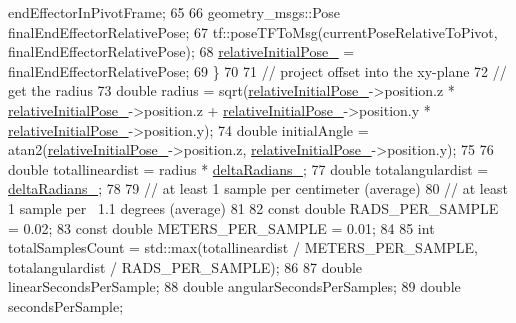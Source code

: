 \begin{DoxyCode}
      endEffectorInPivotFrame;
65 
66                 geometry\_msgs::Pose finalEndEffectorRelativePose;
67                 tf::poseTFToMsg(currentPoseRelativeToPivot, finalEndEffectorRelativePose);
68                 \hyperlink{classcl__move__group__interface_1_1CbCircularPivotMotion_a1b2cc65d2f27a4dec54c20f1f00d4bb8}{relativeInitialPose\_} = finalEndEffectorRelativePose;
69             \}
70 
71             \textcolor{comment}{// project offset into the xy-plane}
72             \textcolor{comment}{// get the radius}
73             \textcolor{keywordtype}{double} radius = sqrt(\hyperlink{classcl__move__group__interface_1_1CbCircularPivotMotion_a1b2cc65d2f27a4dec54c20f1f00d4bb8}{relativeInitialPose\_}->position.z * 
      \hyperlink{classcl__move__group__interface_1_1CbCircularPivotMotion_a1b2cc65d2f27a4dec54c20f1f00d4bb8}{relativeInitialPose\_}->position.z + \hyperlink{classcl__move__group__interface_1_1CbCircularPivotMotion_a1b2cc65d2f27a4dec54c20f1f00d4bb8}{relativeInitialPose\_}->position.y
       * \hyperlink{classcl__move__group__interface_1_1CbCircularPivotMotion_a1b2cc65d2f27a4dec54c20f1f00d4bb8}{relativeInitialPose\_}->position.y);
74             \textcolor{keywordtype}{double} initialAngle = atan2(\hyperlink{classcl__move__group__interface_1_1CbCircularPivotMotion_a1b2cc65d2f27a4dec54c20f1f00d4bb8}{relativeInitialPose\_}->position.z, 
      \hyperlink{classcl__move__group__interface_1_1CbCircularPivotMotion_a1b2cc65d2f27a4dec54c20f1f00d4bb8}{relativeInitialPose\_}->position.y);
75 
76             \textcolor{keywordtype}{double} totallineardist = radius * \hyperlink{classcl__move__group__interface_1_1CbCircularPivotMotion_afade33f1182615c64ea972075bfd2b95}{deltaRadians\_};
77             \textcolor{keywordtype}{double} totalangulardist = \hyperlink{classcl__move__group__interface_1_1CbCircularPivotMotion_afade33f1182615c64ea972075bfd2b95}{deltaRadians\_};
78 
79             \textcolor{comment}{// at least 1 sample per centimeter (average)}
80             \textcolor{comment}{// at least 1 sample per ~1.1 degrees (average)}
81 
82             \textcolor{keyword}{const} \textcolor{keywordtype}{double} RADS\_PER\_SAMPLE = 0.02;
83             \textcolor{keyword}{const} \textcolor{keywordtype}{double} METERS\_PER\_SAMPLE = 0.01;
84 
85             \textcolor{keywordtype}{int} totalSamplesCount = std::max(totallineardist / METERS\_PER\_SAMPLE, totalangulardist / 
      RADS\_PER\_SAMPLE);
86 
87             \textcolor{keywordtype}{double} linearSecondsPerSample;
88             \textcolor{keywordtype}{double} angularSecondsPerSamples;
89             \textcolor{keywordtype}{double} secondsPerSample;

\end{DoxyCode}
